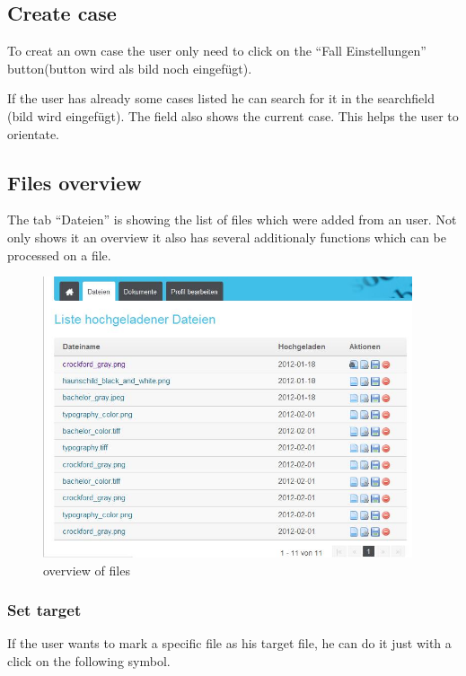 \subsection{Create case}

To creat an own case the user only need to click on the \enquote{Fall Einstellungen} button(button wird als bild noch eingefügt).

If the user has already some cases listed he can search for it in the searchfield (bild wird eingefügt). The field also shows the current case. This helps the user to orientate.

\subsection{Files overview}

The tab \enquote{Dateien} is showing the list of files which were added from an user. Not only shows it an overview it 
also has several additionaly functions which can be processed on a file.

\begin{figure}[!ht]
  \centering
    \includegraphics[width=0.97\textwidth]{images/basic_functionalities/dateien.jpg}
  \caption{overview of files}
  \label{fig:einloggen}
\end{figure}

\subsubsection{Set target}

If the user wants to mark a specific file as his target file, he can do it just with a click on the following symbol.

